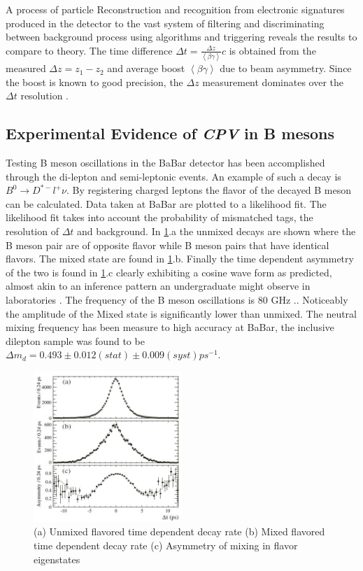 A process of particle Reconstruction and recognition from electronic signatures produced in the detector to the vast system of filtering and discriminating between background process using algorithms and triggering reveals the results to compare to theory. The time difference $\Delta t = \frac{\Delta z}{\left< \beta\gamma\right>} c$ is obtained from the measured $\Delta z=z_1 - z_2$ and average boost $\left<\beta\gamma\right>$ due to beam asymmetry. Since the boost is known to good precision, the $\Delta z$ measurement dominates over the $\Delta t$ resolution \cite{B4}.
\subsection{Experimental Evidence of \textit{CPV} in B mesons}
Testing B meson oscillations in the BaBar detector has been accomplished through the di-lepton and semi-leptonic events. An example of such a decay is $B^{0}\rightarrow D^{*-}l^{+}\nu$. By registering charged leptons the flavor of the decayed B meson can be calculated. Data taken at BaBar are plotted to a likelihood fit. The likelihood fit takes into account the probability of mismatched tags, the resolution of $\Delta t$ and background. In \cref{BBD4}.a the unmixed decays are shown where the B meson pair are of opposite flavor while B meson pairs that have identical flavors. The mixed state are found in \cref{BBD4}.b. Finally the time dependent asymmetry of the two is found in \cref{BBD4}.c clearly exhibiting a cosine wave form as predicted, almost akin to an inference pattern an undergraduate might observe in laboratories \cite{B19}. The frequency of the B meson oscillations is 80 GHz .\cite{B1}. Noticeably the amplitude of the Mixed state is significantly lower than unmixed. The neutral mixing frequency has been measure to high accuracy at BaBar, the inclusive dilepton sample was found to be $\Delta m_d = 0.493 \pm 0.012(stat) \pm 0.009(syst) ps^{-1}$.

 \begin{figure}[h]
\centering
\includegraphics[width=0.5\textwidth]{figs/Flavourosscilatons.JPG}
\caption{(a) Unmixed flavored time dependent decay rate (b) Mixed flavored time dependent decay rate (c) Asymmetry of mixing in flavor eigenstates \cite{B1}}
\label{BBD4}
\end{figure}

